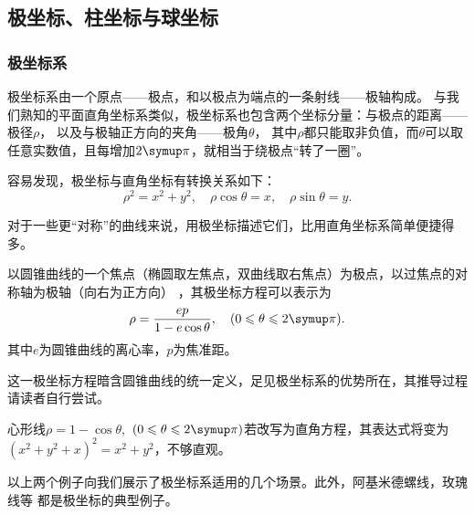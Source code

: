 \subsection{极坐标、柱坐标与球坐标}
\subsubsection{极坐标系}
极坐标系由一个原点——极点，和以极点为端点的一条射线——极轴构成。
与我们熟知的平面直角坐标系类似，极坐标系也包含两个坐标分量：与极点的距离——极径$\rho $，
以及与极轴正方向的夹角——极角$\theta $，
其中$\rho $都只能取非负值，而$\theta $可以取任意实数值，且每增加$2\symup\pi$，就相当于绕极点“转了一圈”。


容易发现，极坐标与直角坐标有转换关系如下：
\[
    \rho ^2=x^2+y^2,\quad\rho \cos \theta=x,\quad\rho \sin \theta=y
    .\]


对于一些更“对称”的曲线来说，用极坐标描述它们，比用直角坐标系简单便捷得多。
\begin{example}
    以圆锥曲线的一个焦点（椭圆取左焦点，双曲线取右焦点）为极点，以过焦点的对称轴为极轴（向右为正方向）
    ，其极坐标方程可以表示为
    \[
        \rho =\frac{ep}{1-e\cos \theta},\quad(0\leqslant \theta \leqslant 2 \symup\pi)
        .\]
    其中$e$为圆锥曲线的离心率，$p$为焦准距。
\end{example}


这一极坐标方程暗含圆锥曲线的统一定义，足见极坐标系的优势所在，其推导过程请读者自行尝试。%
\begin{example}
    心形线$\rho =1-\cos \theta$,~$ (0\leqslant \theta \leqslant 2 \symup\pi)$若改写为直角方程，其表达式将变为
    $(x^2+y^2+x)^2=x^2+y^2$，不够直观。
\end{example}

\begin{center}
\end{center}

以上两个例子向我们展示了极坐标系适用的几个场景。此外，阿基米德螺线，玫瑰线等
都是极坐标的典型例子。

